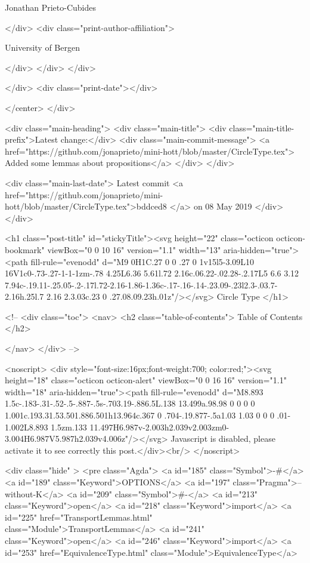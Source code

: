                   Jonathan Prieto-Cubides
                
              </div>
              <div class="print-author-affiliation">
                
                  University of Bergen
                
                </div>
            </div>
          </div>
          
          
        </div>
        <div class="print-date"></div>
        
        
    </center>
  </div>

  
  <div class="main-heading">
    <div class="main-title">
      <div class="main-title-prefix">Latest change:</div>
      <div class="main-commit-message">
            <a href="https://github.com/jonaprieto/mini-hott/blob/master/CircleType.tex">
              Added some lemmas about propositions</a>
      </div>
    </div>

    <div class="main-last-date">
      Latest commit <a href="https://github.com/jonaprieto/mini-hott/blob/master/CircleType.tex">bddced8 </a> on  08 May 2019
    </div>
  </div>
  
  <h1 class="post-title" id="stickyTitle"><svg height="22" class="octicon octicon-bookmark" viewBox="0 0 10 16" version="1.1" width="13" aria-hidden="true"><path fill-rule="evenodd" d="M9 0H1C.27 0 0 .27 0 1v15l5-3.09L10 16V1c0-.73-.27-1-1-1zm-.78 4.25L6.36 5.61l.72 2.16c.06.22-.02.28-.2.17L5 6.6 3.12 7.94c-.19.11-.25.05-.2-.17l.72-2.16-1.86-1.36c-.17-.16-.14-.23.09-.23l2.3-.03.7-2.16h.25l.7 2.16 2.3.03c.23 0 .27.08.09.23h.01z"/></svg> Circle Type
  </h1>

  <!-- 
  <div class="toc">
    <nav>
    <h2 class="table-of-contents"> Table of Contents </h2>
      

    </nav>
  </div>
   -->

  <noscript>
  <div style="font-size:16px;font-weight:700; color:red;"><svg height="18" class="octicon octicon-alert" viewBox="0 0 16 16" version="1.1" width="18" aria-hidden="true"><path fill-rule="evenodd" d="M8.893 1.5c-.183-.31-.52-.5-.887-.5s-.703.19-.886.5L.138 13.499a.98.98 0 0 0 0 1.001c.193.31.53.501.886.501h13.964c.367 0 .704-.19.877-.5a1.03 1.03 0 0 0 .01-1.002L8.893 1.5zm.133 11.497H6.987v-2.003h2.039v2.003zm0-3.004H6.987V5.987h2.039v4.006z"/></svg> Javascript is disabled, please activate it to see correctly this post.</div><br/>
  </noscript>

  <div class="hide" >
<pre class="Agda">
<a id="185" class="Symbol">{-#</a> <a id="189" class="Keyword">OPTIONS</a> <a id="197" class="Pragma">--without-K</a> <a id="209" class="Symbol">#-}</a>
<a id="213" class="Keyword">open</a> <a id="218" class="Keyword">import</a> <a id="225" href="TransportLemmas.html" class="Module">TransportLemmas</a>
<a id="241" class="Keyword">open</a> <a id="246" class="Keyword">import</a> <a id="253" href="EquivalenceType.html" class="Module">EquivalenceType</a>

